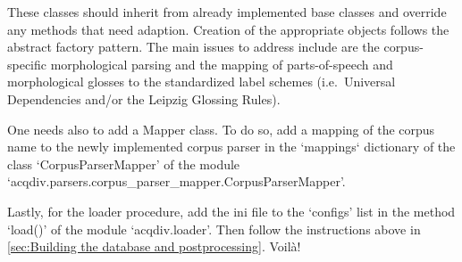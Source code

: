 \documentclass[a4paper, 11pt]{book}
\begin{document}
These classes should inherit from already implemented base classes and override any methods that need adaption. Creation of the appropriate objects follows the abstract factory pattern. The main issues to address include are the corpus-specific morphological parsing and the mapping of parts-of-speech and morphological glosses to the standardized label schemes (i.e.\ Universal Dependencies and/or the Leipzig Glossing Rules).

One needs also to add a Mapper class. To do so, add a mapping of the corpus name to the newly implemented corpus parser in
the `mappings` dictionary of the class `CorpusParserMapper' of the module `acqdiv.parsers.corpus\_parser\_mapper.CorpusParserMapper'.

Lastly, for the loader procedure, add the ini file to the `configs' list in the method `load()' of the module `acqdiv.loader'. Then follow the instructions above in \autoref{sec:Building the database and postprocessing}. Voilà!


 

\end{document}
